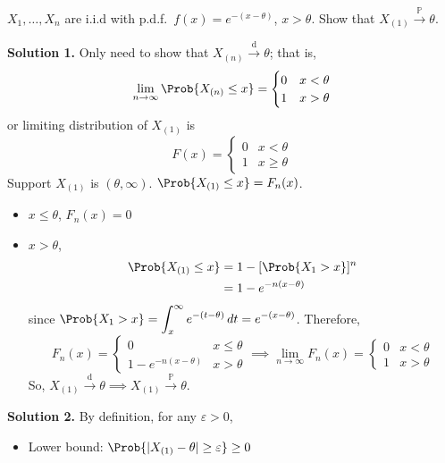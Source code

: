 \begin{Example}{}{}
    $ X_1,\ldots,X_n $ are i.i.d with p.d.f.\
    $ f(x)=e^{-(x-\theta)} $, $ x>\theta $. Show that
    $ X_{(1)}\stackrel{\mathbb{P}}{\to}\theta $.

    \textbf{Solution 1.} Only need to show that $ X_{(n)}\stackrel{\text{d}}{\to}\theta $;
    that is,
    \[ \lim\limits_{{n} \to {\infty}} \Prob{X_{(n)}\le x}
        =\begin{cases}
            0 & x<\theta \\
            1 & x>\theta
        \end{cases} \]
    or limiting distribution of $ X_{(1)} $ is
    \[ F(x)=\begin{cases}
            0 & x< \theta   \\
            1 & x\ge \theta
        \end{cases} \]
    Support $ X_{(1)} $ is $ (\theta,\infty) $.
    $ \Prob{X_{(1)}\le x}=F_n(x) $.
    \begin{itemize}
        \item $ x\le \theta $, $ F_n(x)=0 $
        \item $ x>\theta $,
              \begin{align*}
                  \Prob{X_{(1)}\le x}
                   & =1-[\Prob{X_1>x}]^n \\
                   & =1-e^{-n(x-\theta)}
              \end{align*}
              since
              $ \displaystyle  \Prob{X_1>x}=\int_{x}^{\infty} e^{-(t-\theta)}\, d{t}=
                  e^{-(x-\theta)}  $. Therefore,
              \[ F_n(x)=\begin{cases}
                      0                  & x\le \theta \\
                      1-e^{-n(x-\theta)} & x>\theta
                  \end{cases}\implies
                  \lim\limits_{{n} \to {\infty}} F_n(x)=
                  \begin{cases}
                      0 & x<\theta \\
                      1 & x>\theta
                  \end{cases} \]
              So, $ X_{(1)}\stackrel{\text{d}}{\to}\theta\implies
                  X_{(1)}\stackrel{\mathbb{P}}{\to}\theta $.
    \end{itemize}
    \textbf{Solution 2.} By definition, for any $ \varepsilon>0 $,
    \begin{itemize}
        \item Lower bound: $ \Prob{\abs{X_{(1)}-\theta}\ge \varepsilon}\ge 0 $

\end{itemize}
\end{Example}
